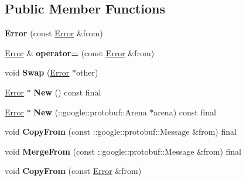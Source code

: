 \subsection*{Public Member Functions}
\begin{DoxyCompactItemize}
\item 
\mbox{\label{classcoappbrpc_1_1Error_a1a325665c85fc96f082a311cb3e3fc23}} 
{\bfseries Error} (const \hyperlink{classcoappbrpc_1_1Error}{Error} \&from)
\item 
\mbox{\label{classcoappbrpc_1_1Error_a06adcbeeca663447f9cf0387740f0744}} 
\hyperlink{classcoappbrpc_1_1Error}{Error} \& {\bfseries operator=} (const \hyperlink{classcoappbrpc_1_1Error}{Error} \&from)
\item 
\mbox{\label{classcoappbrpc_1_1Error_a0e09aab9715bdfa1c467f9ca7c4ed75a}} 
void {\bfseries Swap} (\hyperlink{classcoappbrpc_1_1Error}{Error} $\ast$other)
\item 
\mbox{\label{classcoappbrpc_1_1Error_ae52bf2329532524ec95a3e60225a62a2}} 
\hyperlink{classcoappbrpc_1_1Error}{Error} $\ast$ {\bfseries New} () const final
\item 
\mbox{\label{classcoappbrpc_1_1Error_ac4bce964cb8730485d628a206af6d117}} 
\hyperlink{classcoappbrpc_1_1Error}{Error} $\ast$ {\bfseries New} (\+::google\+::protobuf\+::\+Arena $\ast$arena) const final
\item 
\mbox{\label{classcoappbrpc_1_1Error_abf9ba3b9723a2d981aaf83d22ec8757a}} 
void {\bfseries Copy\+From} (const \+::google\+::protobuf\+::\+Message \&from) final
\item 
\mbox{\label{classcoappbrpc_1_1Error_ab853399916ca41d8eaa2aab0535533d0}} 
void {\bfseries Merge\+From} (const \+::google\+::protobuf\+::\+Message \&from) final
\item 
\mbox{\label{classcoappbrpc_1_1Error_a52ca8b242a78f111be7735895160a1a3}} 
void {\bfseries Copy\+From} (const \hyperlink{classcoappbrpc_1_1Error}{Error} \&from)
\item 
\mbox{\label{classcoappbrpc_1_1Error_a9b8eca3a850aa4c53c8b46203c2dbffd}} 

\end{DoxyCompactItemize}
